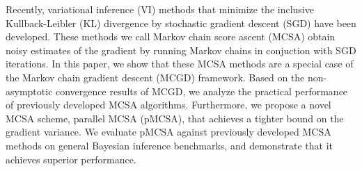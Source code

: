 
Recently, variational inference (VI) methods that minimize the inclusive Kullback-Leibler (KL) divergence by stochastic gradient descent (SGD) have been developed.
These methods we call Markov chain score ascent (MCSA) obtain noisy estimates of the gradient by running Markov chains in conjuction with SGD iterations.
In this paper, we show that these MCSA methods are a special case of the Markov chain gradient descent (MCGD) framework.
Based on the non-asymptotic convergence results of MCGD, we analyze the practical performance of previously developed MCSA algorithms.
Furthermore, we propose a novel MCSA scheme, parallel MCSA (pMCSA), that achieves a tighter bound on the gradient variance.
We evaluate pMCSA against previously developed MCSA methods on general Bayesian inference benchmarks, and demonstrate that it achieves superior performance.


